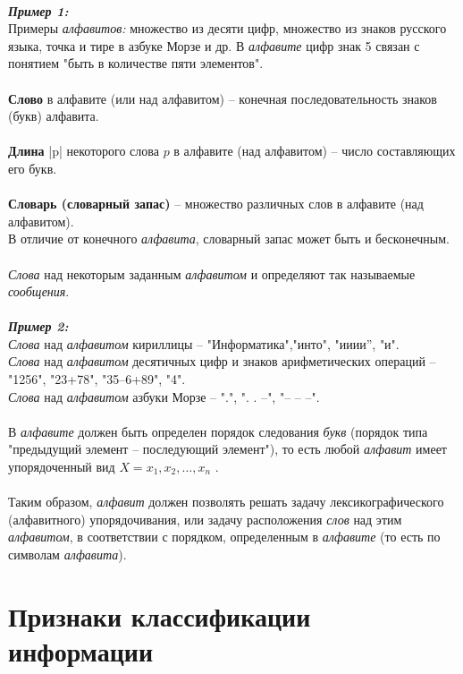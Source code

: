 \\\emph{\textbf{Пример 1:}}
\\Примеры \emph{алфавитов:} множество из десяти цифр, множество из знаков русского языка, точка и тире в азбуке Морзе и др. В \emph{алфавите} цифр знак 5 связан с понятием "быть в количестве пяти элементов".\\
\\\textbf{Слово} в алфавите (или над алфавитом) -- конечная последовательность знаков (букв) алфавита.
\\
\\\textbf{Длина} |p| некоторого слова $p$ в алфавите (над алфавитом) -- число составляющих его букв.
\\
\\\textbf{Словарь (словарный запас)} -- множество различных слов в алфавите (над алфавитом).
\\В отличие от конечного \emph{алфавита}, словарный запас может быть и бесконечным.\\
\\\emph{Слова} над некоторым заданным \emph{алфавитом} и определяют так называемые \emph{сообщения}.\\
\\\emph{\textbf{Пример 2:}}
\\\emph{Слова} над \emph{алфавитом} кириллицы -- "Информатика","инто", "ииии'', "и". 
\\\emph{Слова} над \emph{алфавитом} десятичных цифр и знаков арифметических операций – "1256", "23+78", "35–6+89", "4". 
\\\emph{Слова} над \emph{алфавитом} азбуки Морзе – ".", ". . –", "– – –".\\
\\В  \emph{алфавите} должен быть определен порядок следования \emph{букв} (порядок типа "предыдущий элемент – последующий элемент"), то есть любой \emph{алфавит} имеет упорядоченный вид $X = {x_1, x_2, …, x_n}$ .\\
\\Таким образом, \emph{алфавит} должен позволять решать задачу лексикографического (алфавитного) упорядочивания, или задачу расположения \emph{слов} над этим \emph{алфавитом}, в соответствии с порядком, определенным в \emph{алфавите} (то есть по символам \emph{алфавита}).

\section{Признаки классификации информации}

